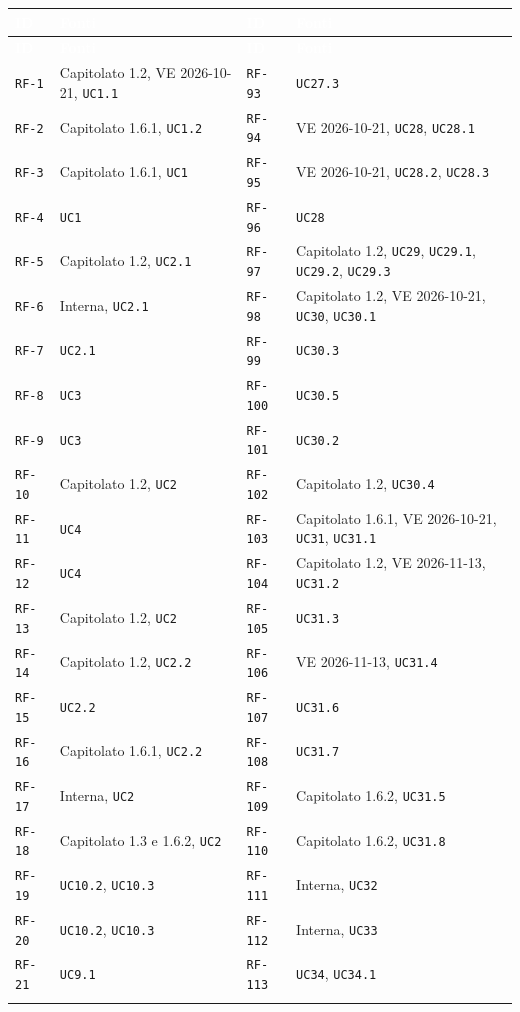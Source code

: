 \documentclass[12pt,a4paper]{article}
\newcommand{\thc}[1]{\textcolor{white}{\textbf{#1}}}
\newcommand{\rl}{\\ \arrayrulecolor{bfline}\hline}
\begin{document}
\begin{longtable}{>{\raggedright\arraybackslash}p{}>{\raggedright\arraybackslash}p{}>{\raggedright\arraybackslash}p{}>{\raggedright\arraybackslash}p{}}
\rowcolor{bfblue}\thc{ID} & \thc{Fonti} & \thc{ID} & \thc{Fonti} \\ \endfirsthead
\rowcolor{bfblue}\thc{ID} & \thc{Fonti} & \thc{ID} & \thc{Fonti} \\ \endhead
\texttt{RF-1} & Capitolato 1.2, VE 2026-10-21, \texttt{UC1.1} & \texttt{RF-93} & \texttt{UC27.3} \rl
\texttt{RF-2} & Capitolato 1.6.1, \texttt{UC1.2} & \texttt{RF-94} & VE 2026-10-21, \texttt{UC28}, \texttt{UC28.1} \rl
\texttt{RF-3} & Capitolato 1.6.1, \texttt{UC1} & \texttt{RF-95} & VE 2026-10-21, \texttt{UC28.2}, \texttt{UC28.3} \rl
\texttt{RF-4} & \texttt{UC1} & \texttt{RF-96} & \texttt{UC28} \rl
\texttt{RF-5} & Capitolato 1.2, \texttt{UC2.1} & \texttt{RF-97} & Capitolato 1.2, \texttt{UC29}, \texttt{UC29.1}, \texttt{UC29.2}, \texttt{UC29.3} \rl
\texttt{RF-6} & Interna, \texttt{UC2.1} & \texttt{RF-98} & Capitolato 1.2, VE 2026-10-21, \texttt{UC30}, \texttt{UC30.1} \rl
\texttt{RF-7} & \texttt{UC2.1} & \texttt{RF-99} & \texttt{UC30.3} \rl
\texttt{RF-8} & \texttt{UC3} & \texttt{RF-100} & \texttt{UC30.5} \rl
\texttt{RF-9} & \texttt{UC3} & \texttt{RF-101} & \texttt{UC30.2} \rl
\texttt{RF-10} & Capitolato 1.2, \texttt{UC2} & \texttt{RF-102} & Capitolato 1.2, \texttt{UC30.4} \rl
\texttt{RF-11} & \texttt{UC4} & \texttt{RF-103} & Capitolato 1.6.1, VE 2026-10-21, \texttt{UC31}, \texttt{UC31.1} \rl
\texttt{RF-12} & \texttt{UC4} & \texttt{RF-104} & Capitolato 1.2, VE 2026-11-13, \texttt{UC31.2} \rl
\texttt{RF-13} & Capitolato 1.2, \texttt{UC2} & \texttt{RF-105} & \texttt{UC31.3} \rl
\texttt{RF-14} & Capitolato 1.2, \texttt{UC2.2} & \texttt{RF-106} & VE 2026-11-13, \texttt{UC31.4} \rl
\texttt{RF-15} & \texttt{UC2.2} & \texttt{RF-107} & \texttt{UC31.6} \rl
\texttt{RF-16} & Capitolato 1.6.1, \texttt{UC2.2} & \texttt{RF-108} & \texttt{UC31.7} \rl
\texttt{RF-17} & Interna, \texttt{UC2} & \texttt{RF-109} & Capitolato 1.6.2, \texttt{UC31.5} \rl
\texttt{RF-18} & Capitolato 1.3 e 1.6.2, \texttt{UC2} & \texttt{RF-110} & Capitolato 1.6.2, \texttt{UC31.8} \rl
\texttt{RF-19} & \texttt{UC10.2}, \texttt{UC10.3} & \texttt{RF-111} & Interna, \texttt{UC32} \rl
\texttt{RF-20} & \texttt{UC10.2}, \texttt{UC10.3} & \texttt{RF-112} & Interna, \texttt{UC33} \rl
\texttt{RF-21} & \texttt{UC9.1} & \texttt{RF-113} & \texttt{UC34}, \texttt{UC34.1} \rl

\end{longtable}
\end{document}
